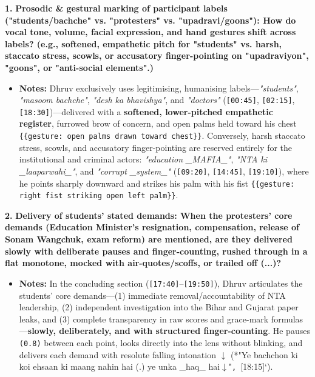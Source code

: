 \documentclass[10pt,a4paper]{article}
\begin{document}
\noindent\textbf{1.} \textbf{Prosodic \& gestural marking of participant labels ("students/bachche" vs. "protesters" vs. "upadravi/goons"): How do vocal tone, volume, facial expression, and hand gestures shift across labels? (e.g., softened, empathetic pitch for "students" vs. harsh, staccato stress, scowls, or accusatory finger-pointing on "upadraviyon", "goons", or "anti-social elements".)}\par\smallskip
\begin{itemize}
  \item \textbf{Notes:}
Dhruv exclusively uses legitimising, humanising labels---\textit{"students"}, \textit{"masoom bachche"}, \textit{"desh ka bhavishya"}, and \textit{"doctors"} (\texttt{[00:45]}, \texttt{[02:15]}, \texttt{[18:30]})---delivered with a \textbf{softened, lower-pitched empathetic register}, furrowed brow of concern, and open palms held toward his chest \texttt{\{\{gesture: open palms drawn toward chest\}\}}. Conversely, harsh staccato stress, scowls, and accusatory finger-pointing are reserved entirely for the institutional and criminal actors: \textit{"education \_MAFIA\_"}, \textit{"NTA ki \_laaparwahi\_"}, and \textit{"corrupt \_system\_"} (\texttt{[09:20]}, \texttt{[14:45]}, \texttt{[19:10]}), where he points sharply downward and strikes his palm with his fist \texttt{\{\{gesture: right fist striking open left palm\}\}}.\par\smallskip
\end{itemize}

\noindent\textbf{2.} \textbf{Delivery of students' stated demands: When the protesters' core demands (Education Minister's resignation, compensation, release of Sonam Wangchuk, exam reform) are mentioned, are they delivered slowly with deliberate pauses and finger-counting, rushed through in a flat monotone, mocked with air-quotes/scoffs, or trailed off (...)?}\par\smallskip
\begin{itemize}
  \item \textbf{Notes:}
In the concluding section (\texttt{[17:40]}--\texttt{[19:50]}), Dhruv articulates the students' core demands---(1) immediate removal/accountability of NTA leadership, (2) independent investigation into the Bihar and Gujarat paper leaks, and (3) complete transparency in raw scores and grace-mark formulas---\textbf{slowly, deliberately, and with structured finger-counting}. He pauses \texttt{(0.8)} between each point, looks directly into the lens without blinking, and delivers each demand with resolute falling intonation \texttt{$\downarrow$} (*"Ye bachchon ki koi ehsaan ki maang nahin hai (.) ye unka \_haq\_ hai$\downarrow$"\texttt{, }[18:15]`).\par\smallskip
\end{itemize}
\end{document}

